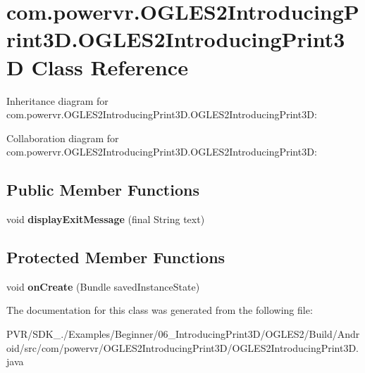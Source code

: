 \hypertarget{classcom_1_1powervr_1_1_o_g_l_e_s2_introducing_print3_d_1_1_o_g_l_e_s2_introducing_print3_d}{\section{com.\+powervr.\+O\+G\+L\+E\+S2\+Introducing\+Print3\+D.\+O\+G\+L\+E\+S2\+Introducing\+Print3\+D Class Reference}
\label{classcom_1_1powervr_1_1_o_g_l_e_s2_introducing_print3_d_1_1_o_g_l_e_s2_introducing_print3_d}
}


Inheritance diagram for com.\+powervr.\+O\+G\+L\+E\+S2\+Introducing\+Print3\+D.\+O\+G\+L\+E\+S2\+Introducing\+Print3\+D\+:


Collaboration diagram for com.\+powervr.\+O\+G\+L\+E\+S2\+Introducing\+Print3\+D.\+O\+G\+L\+E\+S2\+Introducing\+Print3\+D\+:
\subsection*{Public Member Functions}
\begin{DoxyCompactItemize}
\item 
\hypertarget{classcom_1_1powervr_1_1_o_g_l_e_s2_introducing_print3_d_1_1_o_g_l_e_s2_introducing_print3_d_a1f99e478822c734694ed062ce06fcf81}{void {\bfseries display\+Exit\+Message} (final String text)}\label{classcom_1_1powervr_1_1_o_g_l_e_s2_introducing_print3_d_1_1_o_g_l_e_s2_introducing_print3_d_a1f99e478822c734694ed062ce06fcf81}

\end{DoxyCompactItemize}
\subsection*{Protected Member Functions}
\begin{DoxyCompactItemize}
\item 
\hypertarget{classcom_1_1powervr_1_1_o_g_l_e_s2_introducing_print3_d_1_1_o_g_l_e_s2_introducing_print3_d_a9c3adb67dbe9818e99b3026e1a2805c8}{void {\bfseries on\+Create} (Bundle saved\+Instance\+State)}\label{classcom_1_1powervr_1_1_o_g_l_e_s2_introducing_print3_d_1_1_o_g_l_e_s2_introducing_print3_d_a9c3adb67dbe9818e99b3026e1a2805c8}

\end{DoxyCompactItemize}


The documentation for this class was generated from the following file\+:\begin{DoxyCompactItemize}
\item 
P\+V\+R/\+S\+D\+K\+\_./\+Examples/\+Beginner/06\+\_\+\+Introducing\+Print3\+D/\+O\+G\+L\+E\+S2/\+Build/\+Android/src/com/powervr/\+O\+G\+L\+E\+S2\+Introducing\+Print3\+D/O\+G\+L\+E\+S2\+Introducing\+Print3\+D.\+java\end{DoxyCompactItemize}
